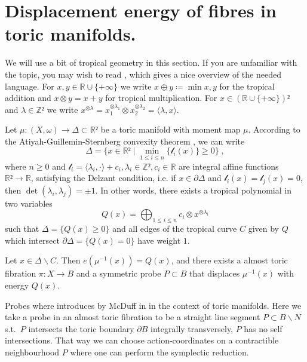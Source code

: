 \documentclass[12pt,a4paper,abstract=true,draft]{scrartcl}
\begin{document}
\section{Displacement energy of fibres in toric manifolds.}

We will use a bit of tropical geometry in this section.
If you are unfamiliar with the topic, you may wish to read \cite[Sections 1-2]{BruSha14}, which gives a nice overview of the needed language.
For $x,y ∈ ℝ ∪ \{+∞\}$ we write $x ⊕ y ≔ \min{x,y}$ for the tropical addition and $x ⊗ y = x+y$ for tropical multiplication.
For $x ∈ (ℝ ∪ \{+∞\})²$ and $λ ∈ ℤ²$ we write $x^{⊗λ} = x_1^{⊗λ_1} ⊗ x_2^{⊗λ_2} = ⟨λ,x⟩$.

Let $μ \colon (X,ω) → Δ ⊂ ℝ²$ be a toric manifold with moment map $μ$.
According to the Atiyah-Guillemin-Sternberg convexity theorem \cite{Ati82,GuiSte82}, we can write
\[Δ = \{x ∈ ℝ² \mid \min_{1 ≤ i ≤ n}\{𝓁_i(x)\} ≥ 0 \} \; ,\]
where $n ≥ 0$ and $𝓁_i = ⟨λ_i, ·⟩ + c_i, λ_i ∈ ℤ², c_i ∈ ℝ$ are integral affine functions $ℝ² → ℝ$, satisfying the Delzant condition, i.e. if $x ∈ ∂Δ$ and $𝓁_i(x) = 𝓁_j(x) = 0$, then $\det(λ_i,λ_j) = ±1$.
In other words, there exists a tropical polynomial in two variables
\[Q(x) = ⨁_{1 ≤ i ≤ n} c_i ⊗ x^{⊗λ_i}\]
such that $Δ = \{Q(x) ≥ 0\}$ and all edges of the tropical curve $C$ given by $Q$ which intersect $∂Δ = \{Q(x) = 0\}$ have weight $1$.

\begin{theorem}
  Let $x ∈ Δ ∖ C$.
  Then $e(μ^{-1}(x)) = Q(x)$, and there exists a almost toric fibration $π\colon X → B$ and a symmetric probe $P ⊂ B$ that displaces $μ^{-1}(x)$ with energy $Q(x)$.
\end{theorem}

Probes where introduces by McDuff in \cite{mcduff2011displacing} in the context of toric manifolds.
Here we take a probe in an almost toric fibration to be a straight line segment $P ⊂ B ∖ N$ s.t.\ $P$ intersects the toric boundary $∂B$ integrally transversely, $P$ has no self intersections.
That way we can choose action-coordinates on a contractible neighbourhood $P$ where one can perform the symplectic reduction.
\end{document}
